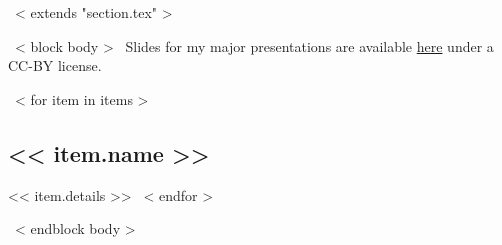 ~< extends "section.tex" >~

~< block body >~
Slides for my major presentations are available
\href{https:www.coleridgefaraday.com/talks/}{here}
under a CC-BY license.

~< for item in items >~
	\subsection{<< item.name >>}
	<< item.details >>
~< endfor >~


~< endblock body >~
